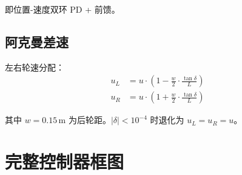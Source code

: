 \documentclass[11pt,a4paper]{article}
\begin{document}
即位置-速度双环 PD + 前馈。

\subsection{阿克曼差速}

左右轮速分配：
\begin{align}
u_L &= u \cdot \left(1 - \frac{w}{2} \cdot \frac{\tan\delta}{L}\right) \\
u_R &= u \cdot \left(1 + \frac{w}{2} \cdot \frac{\tan\delta}{L}\right)
\end{align}

其中 $w = 0.15\,\text{m}$ 为后轮距。$|\delta| < 10^{-4}$ 时退化为 $u_L = u_R = u$。

\section{完整控制器框图}
\end{document}
